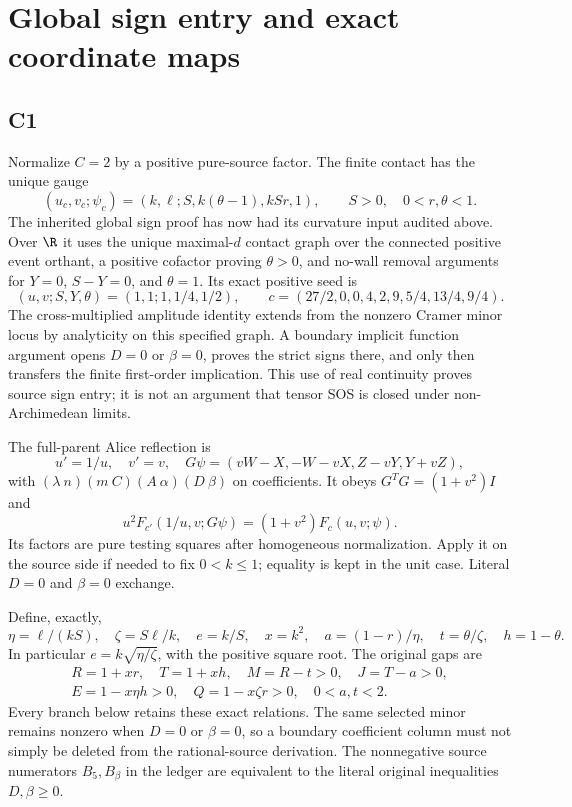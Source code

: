 \section{Global sign entry and exact coordinate maps}

\subsection{C1}

Normalize $C=2$ by a positive pure-source factor. The finite contact has
the unique gauge
\[
(u_c,v_c;\psi_c)=(k,\ell;S,k(\theta-1),kSr,1),
\qquad S>0,\quad0<r,\theta<1.
\]
The inherited global sign proof has now had its curvature input audited
above. Over $\R$ it uses the unique maximal-$d$ contact graph over the
connected positive event orthant, a positive cofactor proving
$\theta>0$, and no-wall removal arguments for $Y=0$, $S-Y=0$, and
$\theta=1$. Its exact positive seed is
\[
(u,v;S,Y,\theta)=(1,1;1,1/4,1/2),\qquad
c=(27/2,0,0,4,2,9,5/4,13/4,9/4).
\]
The cross-multiplied amplitude identity extends from the nonzero Cramer
minor locus by analyticity on this specified graph. A boundary implicit
function argument opens $D=0$ or $\beta=0$, proves the strict signs
there, and only then transfers the finite first-order implication.
This use of real continuity proves source sign entry; it is not an
argument that tensor SOS is closed under non-Archimedean limits.

The full-parent Alice reflection is
\[
u'=1/u,\quad v'=v,\quad
G\psi=(vW-X,-W-vX,Z-vY,Y+vZ),
\]
with $(\lambda\ n)(m\ C)(A\ \alpha)(D\ \beta)$ on coefficients.
It obeys $G^TG=(1+v^2)I$ and
\[
u^2F_{c'}(1/u,v;G\psi)=(1+v^2)F_c(u,v;\psi).
\]
Its factors are pure testing squares after homogeneous normalization.
Apply it on the source side if needed to fix $0<k\le1$; equality is
kept in the unit case. Literal $D=0$ and $\beta=0$ exchange.

Define, exactly,
\[
\eta=\ell/(kS),\quad\zeta=S\ell/k,\quad e=k/S,
\quad x=k^2,\quad a=(1-r)/\eta,\quad t=\theta/\zeta,
\quad h=1-\theta.
\]
In particular $e=k\sqrt{\eta/\zeta}$, with the positive square root.
The original gaps are
\begin{gather*}
R=1+xr,\quad T=1+xh,\quad M=R-t>0,\quad J=T-a>0,\\
E=1-x\eta h>0,\quad Q=1-x\zeta r>0,\quad0<a,t<2.
\end{gather*}
Every branch below retains these exact relations. The same selected
minor remains nonzero when $D=0$ or $\beta=0$, so a boundary coefficient
column must not simply be deleted from the rational-source derivation.
The nonnegative source numerators $B_5,B_\beta$ in the ledger are
equivalent to the literal original inequalities $D,\beta\ge0$.

